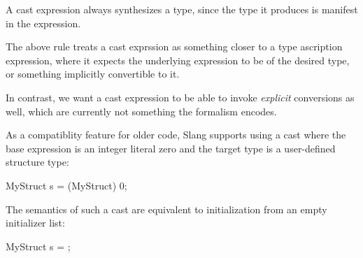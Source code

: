 \begin{Description}
A cast expression always synthesizes a type, since the type it produces is manifest in the expression.
\end{Description}

\begin{Incomplete}
The above rule treats a cast exprssion as something closer to a type ascription expression, where it expects the underlying expression to be of the desired type, or something implicitly convertible to it.

In contrast, we want a cast expression to be able to invoke \emph{explicit} conversions as well, which are currently not something the formalism encodes.
\end{Incomplete}

\begin{Legacy}

As a compatiblity feature for older code, Slang supports using a cast where the base expression is an integer literal zero and the target type is a user-defined structure type:

\begin{codeblock}
MyStruct s = (MyStruct) 0;    
\end{codeblock}

The semantics of such a cast are equivalent to initialization from an empty initializer list:

\begin{codeblock}
MyStruct s = {};
\end{codeblock}

\end{Legacy}


\begin{Syntax}
	 \\
         \code{=} 
\end{Syntax}

\begin{Checking}

\end{Checking}


